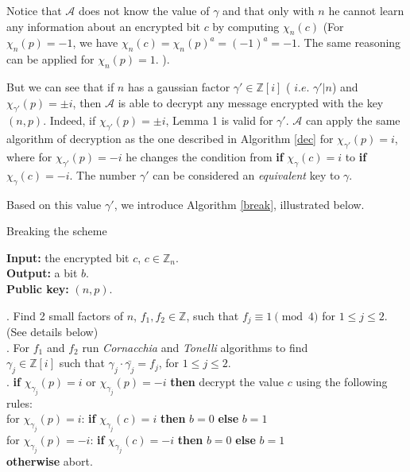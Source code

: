\documentclass[11pt, a4paper, twoside, openright]{report}
\begin{document}
		Notice that $\mathcal{A}$ does not know the value of $\gamma$ and that only with $n$ he cannot learn any information about an 
		encrypted bit $c$ by computing $\chi_n(c)$ (For $\chi_n(p) = -1$, we have $\chi_n(c)= \chi_n(p)^a = (-1)^a = -1$.
		 The same reasoning can be applied for $\chi_n(p)=1$. ). 
		 
		But we can see that if $n$ has a gaussian factor $\gamma' \in \mathbb{Z}[i]$ ( $i.e.$ $\gamma' | n$) and
		$\chi_{\gamma'}(p) = \pm i$, then $\mathcal{A}$ is able to decrypt any message encrypted with 
		the key $(n,p)$. Indeed, if $\chi_{\gamma'}(p) = \pm i$, Lemma 1 is valid for $\gamma'$. $\mathcal{A}$ can 
		apply the same algorithm of decryption as the one described in Algorithm \ref{dec} for $\chi_{\gamma'}(p) = i$,
		where for $\chi_{\gamma'}(p) = -i$ he changes the condition from \textbf{if} $\chi_{\gamma} (c) =i$ to  \textbf{if} $\chi_{\gamma} (c) = -i$. 
		The number $\gamma'$ can be considered an \textit{equivalent} key to $\gamma$.
		
		Based on this value $\gamma'$, we introduce Algorithm \ref{break}, illustrated below.
		
	    \begin{algorithm}
	    \caption{Breaking the scheme}
	    	    	\label{break}
	    	    	\begin{algorithmic}
	    	    	\STATE \textbf{Input:} the encrypted bit $c$, $c \in \mathbb{Z}_n$. \\
	    	    			 \textbf{Output:} a bit $b$.\\
	    	    			 \textbf{Public key:} $(n,p)$.
	    	    	\bigskip
	    	    	
	    	    	\STATE 
	    	    	. Find 2 small factors of $n$, $f_1, f_2 \in \mathbb{Z}$, such that $f_j \equiv 1 \pmod{4}$ for $1 \leq j \leq 2$. (See details below) \\
	    	        . For $f_1$ and $f_2$ run \textit{Cornacchia} and \textit{Tonelli} algorithms to find  \\
	    	        \quad \quad $\gamma_{j} \in \mathbb{Z}[i]$ such that $\gamma_{j} \cdot \bar{\gamma_{j}} = f_j$, for  $1 \leq j \leq 2$. \\
	    	         . \textbf{if} $\chi_{\gamma_{j}} (p) =i$ or $\chi_{\gamma_{j}} (p) = -i$ \textbf{then} decrypt the value $c$ using the following rules:  \\
	    	         \quad \quad for $\chi_{\gamma_{j}} (p) =i$:  \textbf{if} $\chi_{\gamma_{j}} (c) =i$ \textbf{then} $b=0$ \textbf{else} $b=1$ \\
	    	         \quad \quad for $\chi_{\gamma_{j}} (p) = -i$:  \textbf{if} $\chi_{\gamma_{j}} (c) = -i$ \textbf{then} $b=0$ \textbf{else} $b=1$ \\ 
	    	         \quad \quad \textbf{otherwise} abort.
	    	    	\end{algorithmic}
	    	    	\end{algorithm}
	    
\end{document}
